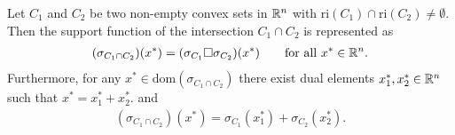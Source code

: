 \begin{ftheorem}
  Let $C_1$ and $C_2$ be two non-empty convex sets in $\mathbb{R}^n$ with
  $\mathrm{ri}(C_1)\cap\mathrm{ri}(C_2)\neq\emptyset.$
  Then the support function of the intersection 
  $
    C_1 \cap C_2
  $
  is represented as
  \begin{gather}
    (\sigma_{
    C_1 \cap C_2
    })
    (x^*)
    =
    (\sigma_{C_1}\square \sigma_{C_2})
    (x^*)
    \qquad
    \text{for all}\ 
    x^* \in \R^n.
  \end{gather}
  Furthermore, for any
  $
  x^*\in \mathrm{dom}
    (\sigma_{
    C_1 \cap C_2
    })
  $
  there exist dual elements 
  $
    x_1^*
    ,
    x_2^*
    \in \mathbb{R}^n
  $ 
  such that 
  $
    x^*
    =
    x_1^*
    +
    x_2^*.
  $
  and
  \begin{gather}
    (\sigma_{
    C_1 \cap C_2
    })
    (x^*)
    =
    \sigma_{C_1}(x_1^*)
    +
    \sigma_{C_2}(x_2^*).
  \end{gather}
\end{ftheorem}
